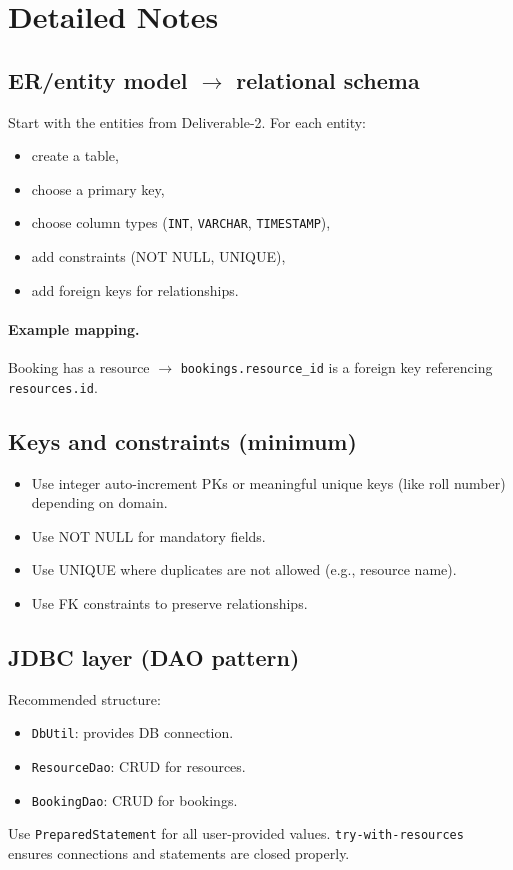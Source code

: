 \documentclass[11pt]{article}
\begin{document}
\section{Detailed Notes}
\subsection{ER/entity model $\rightarrow$ relational schema}
Start with the entities from Deliverable-2.
For each entity:
\begin{itemize}
  \item create a table,
  \item choose a primary key,
  \item choose column types (\texttt{INT}, \texttt{VARCHAR}, \texttt{TIMESTAMP}),
  \item add constraints (NOT NULL, UNIQUE),
  \item add foreign keys for relationships.
\end{itemize}

\paragraph{Example mapping.} Booking has a resource $\rightarrow$ \texttt{bookings.resource\_id} is a foreign key referencing \texttt{resources.id}.

\subsection{Keys and constraints (minimum)}
\begin{itemize}
  \item Use integer auto-increment PKs or meaningful unique keys (like roll number) depending on domain.
  \item Use NOT NULL for mandatory fields.
  \item Use UNIQUE where duplicates are not allowed (e.g., resource name).
  \item Use FK constraints to preserve relationships.
\end{itemize}

\subsection{JDBC layer (DAO pattern)}
Recommended structure:
\begin{itemize}
  \item \texttt{DbUtil}: provides DB connection.
  \item \texttt{ResourceDao}: CRUD for resources.
  \item \texttt{BookingDao}: CRUD for bookings.
\end{itemize}
Use \texttt{PreparedStatement} for all user-provided values.
\texttt{try-with-resources} ensures connections and statements are closed properly.
\notesources{\OOPSUnitVISources}
\end{document}
